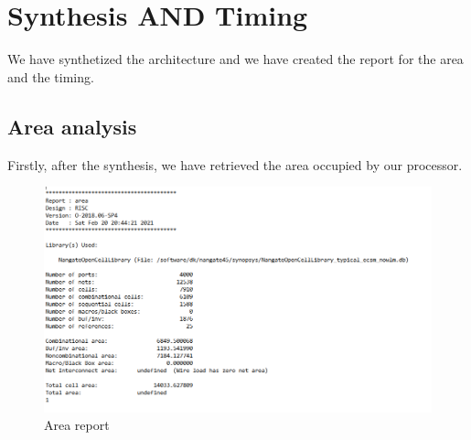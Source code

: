 \chapter{Synthesis AND Timing}
We have synthetized the architecture and we have created the report for the area and the timing.\\
\section{Area analysis}
Firstly, after the synthesis, we have retrieved the area occupied by our processor.
\begin{figure}[h!]
	\centering
	\includegraphics[width=20cm]{./images/RISC_area}
	\caption{Area report}
	\label{fig5.1}
\end{figure} 
